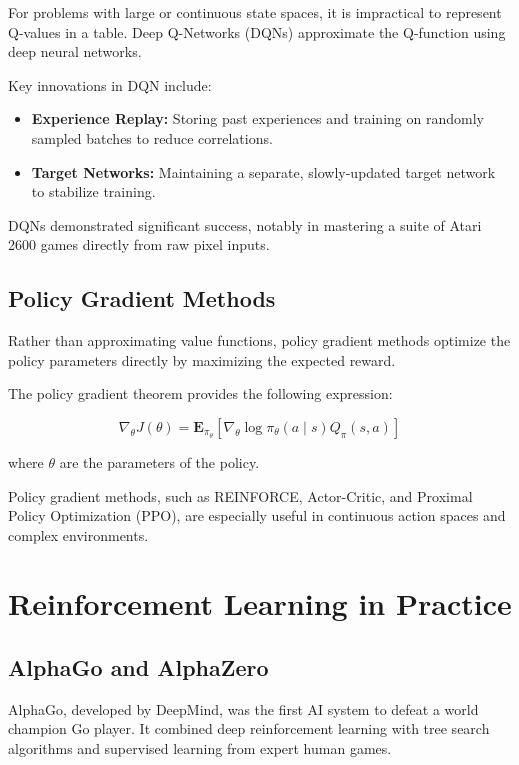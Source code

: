 \documentclass[openany]{book}
\begin{document}
For problems with large or continuous state spaces, it is impractical to 
represent Q-values in a table. Deep Q-Networks (DQNs) approximate the Q-function 
using deep neural networks.

Key innovations in DQN include:

\begin{itemize}
    \item \textbf{Experience Replay:} Storing past experiences and training on 
    randomly sampled batches to reduce correlations.
    \item \textbf{Target Networks:} Maintaining a separate, slowly-updated 
    target network to stabilize training.
\end{itemize}

DQNs demonstrated significant success, notably in mastering a suite of Atari 
2600 games directly from raw pixel inputs.

\subsection{Policy Gradient Methods}

Rather than approximating value functions, policy gradient methods optimize the 
policy parameters directly by maximizing the expected reward.

The policy gradient theorem provides the following expression:

\[
\nabla_\theta J(\theta) = \mathbf{E}_{\pi_\theta} \left[ \nabla_\theta \log 
\pi_\theta(a \mid s) Q_\pi(s,a) \right]
\]

where \( \theta \) are the parameters of the policy.

Policy gradient methods, such as REINFORCE, Actor-Critic, and Proximal Policy
 Optimization (PPO), are especially useful in continuous action spaces and 
 complex environments.

\section{Reinforcement Learning in Practice}

\subsection{AlphaGo and AlphaZero}

AlphaGo, developed by DeepMind, was the first AI system to defeat a world 
champion Go player. It combined deep reinforcement learning with tree search 
algorithms and supervised learning from expert human games.
\end{document}
